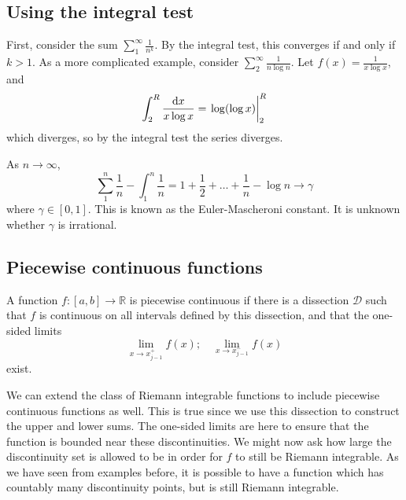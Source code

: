 \subsection{Using the integral test}
First, consider the sum \(\sum_1^\infty \frac{1}{n^k}\).
By the integral test, this converges if and only if \(k > 1\).
As a more complicated example, consider \(\sum_2^\infty \frac{1}{n\log n}\).
Let \(f(x) = \frac{1}{x\log x}\), and
\[
	\int_2^R \frac{\dd{x}}{x\log x} = \eval{\log(\log x)}_2^R
\]
which diverges, so by the integral test the series diverges.
\begin{corollary}
	As \(n \to \infty\),
	\[
		\sum_1^n \frac{1}{n} - \int_1^n \frac{1}{n} = 1 + \frac{1}{2} + \dots + \frac{1}{n} - \log n \to \gamma
	\]
	where \(\gamma \in [0, 1]\).
	This is known as the Euler-Mascheroni constant.
	It is unknown whether \(\gamma\) is irrational.
\end{corollary}

\subsection{Piecewise continuous functions}
\begin{definition}
	A function \(f \colon [a, b] \to \mathbb R\) is piecewise continuous if there is a dissection \(\mathcal D\) such that \(f\) is continuous on all intervals defined by this dissection, and that the one-sided limits
	\[
		\lim_{x \to x_{j-1}^+} f(x);\quad \lim_{x \to x_{j-1}^-} f(x)
	\]
	exist.
\end{definition}
\noindent We can extend the class of Riemann integrable functions to include piecewise continuous functions as well.
This is true since we use this dissection to construct the upper and lower sums.
The one-sided limits are here to ensure that the function is bounded near these discontinuities.
We might now ask how large the discontinuity set is allowed to be in order for \(f\) to still be Riemann integrable.
As we have seen from examples before, it is possible to have a function which has countably many discontinuity points, but is still Riemann integrable.
